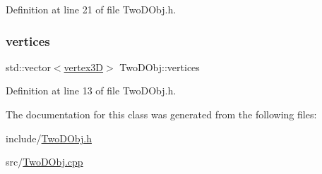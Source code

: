 Definition at line 21 of file Two\+D\+Obj.\+h.

\mbox{\label{class_two_d_obj_ae1325111bfe55914cdcb399bc299442b}} 
\subsubsection{\texorpdfstring{vertices}{vertices}}
{\footnotesize\ttfamily std\+::vector$<$\mbox{\hyperlink{structvertex3_d}{vertex3D}}$>$ Two\+D\+Obj\+::vertices}



Definition at line 13 of file Two\+D\+Obj.\+h.



The documentation for this class was generated from the following files\+:\begin{DoxyCompactItemize}
\item 
include/\mbox{\hyperlink{_two_d_obj_8h}{Two\+D\+Obj.\+h}}\item 
src/\mbox{\hyperlink{_two_d_obj_8cpp}{Two\+D\+Obj.\+cpp}}\end{DoxyCompactItemize}

